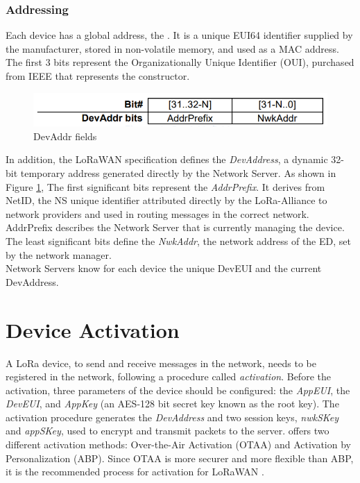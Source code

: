 \subsubsection{Addressing}
Each device has a global address, the \textit{\de}. It is a unique EUI64 identifier supplied by the manufacturer, stored in non-volatile memory, and used as a MAC address. The first 3 bits represent the Organizationally Unique Identifier (OUI), purchased from IEEE that represents the constructor.
\begin{figure}
    \centering
    \includegraphics[width=0.5\linewidth]{images/lorawan/devaddr.PNG}
    \caption{DevAddr fields}
    \label{fig:devaddr}
\end{figure}
In addition, the LoRaWAN specification defines the \textit{DevAddress}, a dynamic 32-bit temporary address generated directly by the Network Server. As shown in Figure \ref{fig:devaddr}, The first significant bits represent the \textit{AddrPrefix}. It derives from NetID, the NS unique identifier attributed directly by the LoRa-Alliance to network providers and used in routing messages in the correct network. AddrPrefix describes the Network Server that is currently managing the device. The least significant bits define the \textit{NwkAddr}, the network address of the ED, set by the network manager.
\\
Network Servers know for each device the unique DevEUI and the current DevAddress.

\section{Device Activation}
A LoRa device, to send and receive messages in the network, needs to be registered in the network, following a procedure called \textit{activation}. Before the activation, three parameters of the device should be configured: the \textit{AppEUI}, the \textit{DevEUI}, and \textit{AppKey} (an AES-128 bit secret key known as the root key). The activation procedure generates the \textit{DevAddress} and two session keys, \textit{nwkSKey} and \textit{appSKey}, used to encrypt and transmit packets to the server. \lorawan offers two different activation methods: Over-the-Air Activation (OTAA) and Activation by Personalization (ABP). Since OTAA is more securer and more flexible than ABP, it is the recommended process for activation for LoRaWAN \cite{the_things_network}.

